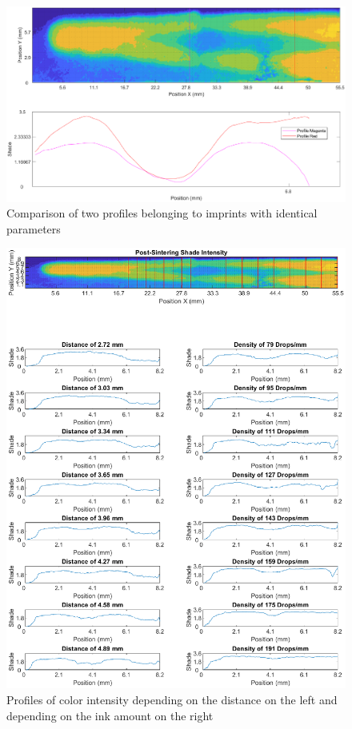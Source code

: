 \begin{figure}[H]
	\centering
	\includegraphics[width=1\textwidth]{grafiken/vmatch.eps}
	\caption{Comparison of two profiles belonging to imprints with identical parameters}
	\label{fig:vmatch}
\end{figure} 

\bigskip



\bigskip

\begin{figure}[H]
	\centering
	\includegraphics[width=1\textwidth]{grafiken/vProfile.eps}
	\caption{Profiles of color intensity depending on the distance on the left and depending on the ink amount on the right}
	\label{fig:vProfile}
\end{figure} 

